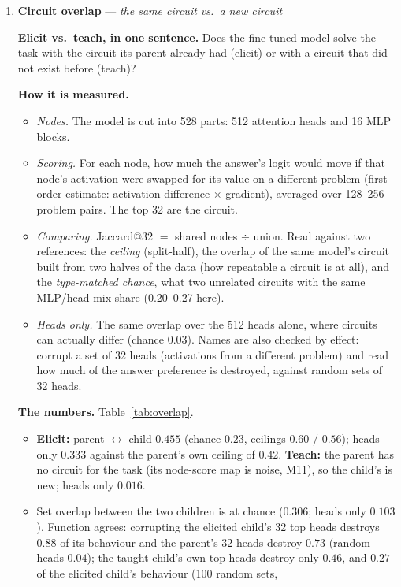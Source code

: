 \documentclass[11pt]{article}
\newcommand{\what}[1]{\par\noindent\textbf{Elicit vs.\ teach, in one sentence.} #1}
\newcommand{\how}[1]{\par\noindent\textbf{How it is measured.} #1}
\newcommand{\numbers}[1]{\par\noindent\textbf{The numbers.} #1\par\medskip}
\newenvironment{steps}{\begin{itemize}[nosep,leftmargin=1.2em,topsep=2pt]}{\end{itemize}}
\newcommand{\metricsec}[2]{\item \textbf{#1} --- \emph{#2}}
\begin{document}


\begin{enumerate}[label=\textbf{M\arabic*}, leftmargin=*, itemsep=1.2em, resume]

\metricsec{Circuit overlap}{the same circuit vs.\ a new circuit}
\what{Does the fine-tuned model solve the task with the circuit its parent already had (elicit)
or with a circuit that did not exist before (teach)?}
\how{
\begin{steps}
\item \emph{Nodes.} The model is cut into 528 parts: 512 attention heads and 16 MLP blocks.
\item \emph{Scoring.} For each node, how much the answer's logit would move if that node's
activation were swapped for its value on a different problem (first-order estimate: activation
difference $\times$ gradient), averaged over 128--256 problem pairs. The top 32 are the circuit.
\item \emph{Comparing.} Jaccard@32 $=$ shared nodes $\div$ union. Read against two references:
the \emph{ceiling} (split-half), the overlap of the same model's circuit built from two halves
of the data (how repeatable a circuit is at all), and the \emph{type-matched chance}, what two
unrelated circuits with the same MLP/head mix share (0.20--0.27 here).
\item \emph{Heads only.} The same overlap over the 512 heads alone, where circuits can actually
differ (chance 0.03). Names are also checked by effect: corrupt a set of 32 heads (activations
from a different problem) and read how much of the answer preference is destroyed, against
random sets of 32 heads.
\end{steps}}
\numbers{Table~\ref{tab:overlap}.
\begin{steps}
\item \textbf{Elicit:} parent $\leftrightarrow$ child $0.455$ (chance $0.23$, ceilings $0.60$ /
$0.56$); heads only $0.333$ against the parent's own ceiling of $0.42$. \textbf{Teach:} the
parent has no circuit for the task (its node-score map is noise, M11), so the child's is new;
heads only $0.016$.
\item Set overlap between the two children is at chance ($0.306$; heads only $0.103$).
Function agrees: corrupting the elicited child's 32 top heads destroys $0.88$ of its behaviour
and the parent's 32 heads destroy $0.73$ (random heads $0.04$); the taught child's own top heads
destroy only $0.46$, and $0.27$ of the elicited child's behaviour (100 random sets,

\end{steps}}
\end{enumerate}
\end{document}
